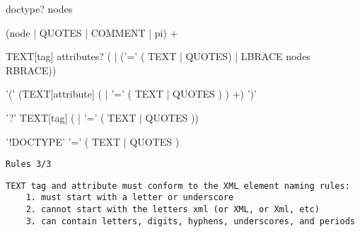 \documentclass[10pt,a4paper]{article}
\begin{document}
\raisebox{8pt}{xmq:}
\begin{minipage}{15cm}
\begin{rail}
  doctype? nodes
\end{rail}
\end{minipage}

\raisebox{45pt}{nodes:}
\begin{minipage}{15cm}
\begin{rail}
  (node | QUOTES | COMMENT | pi) +
\end{rail}
\end{minipage}

\raisebox{33pt}{node:}
\begin{minipage}{15cm}
\begin{rail}
  TEXT[tag] attributes? ( | ('=' ( TEXT | QUOTES) | LBRACE nodes RBRACE))
\end{rail}
\end{minipage}

\raisebox{32pt}{attributes:}
\begin{minipage}{15cm}
\begin{rail}
'(' (TEXT[attribute] ( | '=' ( TEXT | QUOTES ) ) +) ')'
\end{rail}
\end{minipage}

\raisebox{20pt}{pi:}
\begin{minipage}{15cm}
\begin{rail}
'?' TEXT[tag] ( | '=' ( TEXT | QUOTES ))
\end{rail}
\end{minipage}

\raisebox{8pt}{doctype:}
\begin{minipage}{15cm}
\begin{rail}
'!DOCTYPE' '=' ( TEXT | QUOTES )
\end{rail}
\end{minipage}

\pagebreak

\texttt{Rules \hfill 3/3}

\vspace{5mm}

\verb|TEXT tag and attribute must conform to the XML element naming rules:|\\
\verb|    1. must start with a letter or underscore| \\
\verb|    2. cannot start with the letters xml (or XML, or Xml, etc)| \\
\verb|    3. can contain letters, digits, hyphens, underscores, and periods|
\end{document}
